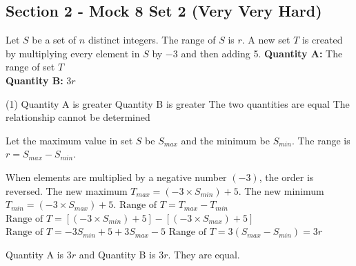 \documentclass[11pt,paper=a4,answers]{exam}
\begin{document}
\begin{questions}
\pointsinrightmargin
\pointsdroppedatright
\marksnotpoints
{}
\pointformat{\boldmath\themarginpoints}
\bracketedpoints


\section*{Section 2 - Mock 8 Set 2 (Very Very Hard)}


\question
Let $S$ be a set of $n$ distinct integers. The range of $S$ is $r$. A new set $T$ is created by multiplying every element in $S$ by $-3$ and then adding 5.
\vspace{5pt}
\textbf{Quantity A: } The range of set $T$ \\
\vspace{5pt}
\textbf{Quantity B: } $3r$

\begin{tasks}(1)
\task[A)] Quantity A is greater
\task[B)] Quantity B is greater
\task[C)] The two quantities are equal
\task[D)] The relationship cannot be determined
\end{tasks}

\begin{solution}
Let the maximum value in set $S$ be $S_{max}$ and the minimum be $S_{min}$. The range is $r = S_{max} - S_{min}$.
\vspace{5pt}
\begin{center}
When elements are multiplied by a negative number $(-3)$, the order is reversed.
\vspace{5pt}
The new maximum $T_{max} = (-3 \times S_{min}) + 5$.
\vspace{5pt}
The new minimum $T_{min} = (-3 \times S_{max}) + 5$.
\vspace{10pt}
$\text{Range of } T = T_{max} - T_{min}$
\vspace{5pt}
$\text{Range of } T = [(-3 \times S_{min}) + 5] - [(-3 \times S_{max}) + 5]$
\vspace{5pt}
$\text{Range of } T = -3S_{min} + 5 + 3S_{max} - 5$
\vspace{5pt}
$\text{Range of } T = 3(S_{max} - S_{min}) = 3r$
\end{center}
\vspace{5pt}
Quantity A is $3r$ and Quantity B is $3r$. They are equal.


\end{solution}
\end{questions}
\end{document}
